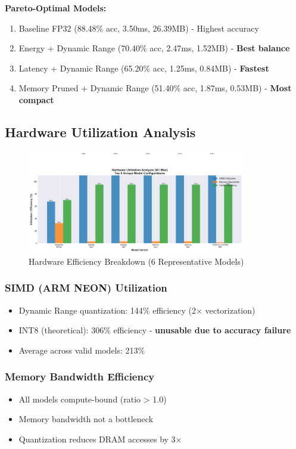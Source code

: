 \documentclass[10pt, a4paper]{article}
\begin{document}
\textbf{Pareto-Optimal Models:}
\begin{enumerate}
    \item Baseline FP32 (88.48\% acc, 3.50ms, 26.39MB) - Highest accuracy
    \item Energy + Dynamic Range (70.40\% acc, 2.47ms, 1.52MB) - \textbf{Best balance}
    \item Latency + Dynamic Range (65.20\% acc, 1.25ms, 0.84MB) - \textbf{Fastest}
    \item Memory Pruned + Dynamic Range (51.40\% acc, 1.87ms, 0.53MB) - \textbf{Most compact}
\end{enumerate}

\subsection{Hardware Utilization Analysis}

\begin{figure}[H]
\centering
\includegraphics[width=0.85\textwidth]{charts/part4_utilization_breakdown.png}
\caption{Hardware Efficiency Breakdown (6 Representative Models)}
\end{figure}

\subsubsection{SIMD (ARM NEON) Utilization}
\begin{itemize}
    \item Dynamic Range quantization: 144\% efficiency (2× vectorization)
    \item INT8 (theoretical): 306\% efficiency - \textbf{unusable due to accuracy failure}
    \item Average across valid models: 213\%
\end{itemize}

\subsubsection{Memory Bandwidth Efficiency}
\begin{itemize}
    \item All models compute-bound (ratio > 1.0)
    \item Memory bandwidth not a bottleneck
    \item Quantization reduces DRAM accesses by 3×
\end{itemize}
\end{document}
